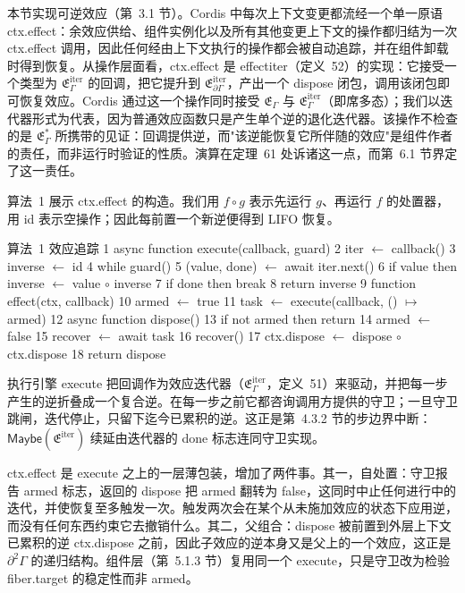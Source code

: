 \documentclass[
  10
]{article}
\begin{document}
本节实现可逆效应（第~3.1 节）。Cordis 中每次上下文变更都流经一个单一原语 ctx.effect：余效应供给、组件实例化以及所有其他变更上下文的操作都归结为一次 ctx.effect 调用，因此任何经由上下文执行的操作都会被自动追踪，并在组件卸载时得到恢复。从操作层面看，ctx.effect 是 effectiter（定义~52）的实现：它接受一个类型为 \({ \mathfrak { E } } _ { \Gamma } ^ { \mathrm { i t e r } }\) 的回调，把它提升到 \({ \mathfrak { E } } _ { \partial \Gamma } ^ { \mathrm { i t e r } }\)，产出一个 dispose 闭包，调用该闭包即可恢复效应。Cordis 通过这一个操作同时接受 \(\mathfrak { E } _ { \Gamma }\) 与 \({ \mathfrak { E } } _ { \Gamma } ^ { \mathrm { i t e r } }\)（即席多态）；我们以迭代器形式为代表，因为普通效应函数只是产生单个逆的退化迭代器。该操作不检查的是 \({ \mathfrak { E } } _ { \Gamma } ^ { * }\) 所携带的见证：回调提供逆，而"该逆能恢复它所伴随的效应"是组件作者的责任，而非运行时验证的性质。演算在定理~61 处诉诸这一点，而第~6.1 节界定了这一责任。

算法~1 展示 ctx.effect 的构造。我们用 \(f \circ g\) 表示先运行 \(g\)、再运行 \(f\) 的处置器，用 id 表示空操作；因此每前置一个新逆便得到 LIFO 恢复。

算法~1 效应追踪
1 async function execute(callback, guard)
2 iter $\leftarrow$ callback()
3 inverse $\leftarrow$ id
4 while guard()
5 (value, done) $\leftarrow$ await iter.next()
6 if value then inverse $\leftarrow$ value $\circ$ inverse
7 if done then break
8 return inverse
9 function effect(ctx, callback)
10 armed $\leftarrow$ true
11 task $\leftarrow$ execute(callback, () $\mapsto$ armed)
12 async function dispose()
13 if not armed then return
14 armed $\leftarrow$ false
15 recover $\leftarrow$ await task
16 recover()
17 ctx.dispose $\leftarrow$ dispose $\circ$ ctx.dispose
18 return dispose

执行引擎 execute 把回调作为效应迭代器（\( \mathfrak { E } _ { \Gamma } ^ { \mathrm { i t e r } }\)，定义~51）来驱动，并把每一步产生的逆折叠成一个复合逆。在每一步之前它都咨询调用方提供的守卫；一旦守卫跳闸，迭代停止，只留下迄今已累积的逆。这正是第~4.3.2 节的步边界中断：\(\mathsf{Maybe}( \mathfrak { E } ^ { \mathrm { i t e r } } )\) 续延由迭代器的 done 标志连同守卫实现。

ctx.effect 是 execute 之上的一层薄包装，增加了两件事。其一，自处置：守卫报告 armed 标志，返回的 dispose 把 armed 翻转为 false，这同时中止任何进行中的迭代，并使恢复至多触发一次。触发两次会在某个从未施加效应的状态下应用逆，而没有任何东西约束它去撤销什么。其二，父组合：dispose 被前置到外层上下文已累积的逆 ctx.dispose 之前，因此子效应的逆本身又是父上的一个效应，这正是 \(\partial ^ { 2 } \Gamma\) 的递归结构。组件层（第~5.1.3 节）复用同一个 execute，只是守卫改为检验 fiber.target 的稳定性而非 armed。
\end{document}
